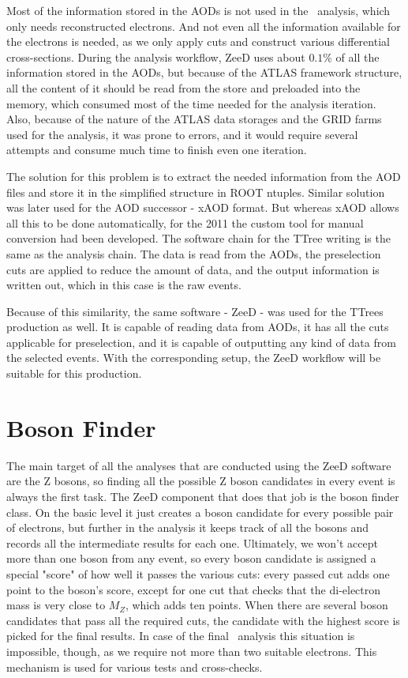 Most of the information stored in the AODs is not used in the \Zee\ analysis, which only needs reconstructed electrons. And not even all the information available for the electrons is needed, as we only apply cuts and construct various differential cross-sections. During the analysis workflow, ZeeD uses about $0.1\%$ of all the information stored in the AODs, but because of the ATLAS framework structure, all the content of it should be read from the store and preloaded into the memory, which consumed most of the time needed for the analysis iteration. Also, because of the nature of the ATLAS data storages and the GRID farms used for the analysis, it was prone to errors, and it would require several attempts and consume much time to finish even one iteration.

The solution for this problem is to extract the needed information from the AOD files and store it in the simplified structure in ROOT ntuples. Similar solution was later used for the AOD successor - xAOD format. But whereas xAOD allows all this to be done automatically, for the 2011 the custom tool for manual conversion had been developed. The software chain for the TTree writing is the same as the analysis chain. The data is read from the AODs, the preselection cuts are applied to reduce the amount of data, and the output information is written out, which in this case is the raw events.

Because of this similarity, the same software - ZeeD - was used for the TTrees production as well. It is capable of reading data from AODs, it has all the cuts applicable for preselection, and it is capable of outputting any kind of data from the selected events. With the corresponding setup, the ZeeD workflow will be suitable for this production.

\section{Boson Finder}

The main target of all the analyses that are conducted using the ZeeD software are the Z bosons, so finding all the possible Z boson candidates in every event is always the first task. The ZeeD component that does that job is the boson finder class. On the basic level it just creates a boson candidate for every possible pair of electrons, but further in the analysis it keeps track of all the bosons and records all the intermediate results for each one. Ultimately, we won't accept more than one boson from any event, so every boson candidate is assigned a special "score" of how well it passes the various cuts: every passed cut adds one point to the boson's score, except for one cut that checks that the di-electron mass is very close to $M_Z$, which adds ten points. When there are several boson candidates that pass all the required cuts, the candidate with the highest score is picked for the final results. In case of the final \Zee\ analysis this situation is impossible, though, as we require not more than two suitable electrons. This mechanism is used for various tests and cross-checks.

